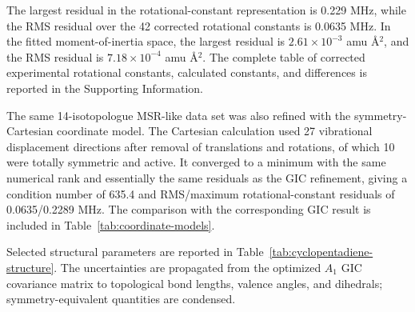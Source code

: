 \documentclass[journal=jctcce,manuscript=article,maxauthors=999]{achemso}
\begin{document}
The largest residual in the rotational-constant representation is 0.229 MHz, while the RMS residual over the 42 corrected rotational constants is 0.0635 MHz. In the fitted moment-of-inertia space, the largest residual is $2.61\times10^{-3}$ amu \AA$^2$, and the RMS residual is $7.18\times10^{-4}$ amu \AA$^2$. The complete table of corrected experimental rotational constants, calculated constants, and differences is reported in the Supporting Information.

The same 14-isotopologue MSR-like data set was also refined with the
symmetry-Cartesian coordinate model. The Cartesian calculation
used 27 vibrational displacement directions after removal of translations and
rotations, of which 10 were totally symmetric and active. It converged to a
minimum with the same numerical rank and essentially the same residuals as the
GIC refinement, giving a condition number of 635.4 and RMS/maximum
rotational-constant residuals of 0.0635/0.2289 MHz. The comparison with the
corresponding GIC result is included in Table~\ref{tab:coordinate-models}.

Selected structural parameters are reported in
Table~\ref{tab:cyclopentadiene-structure}. The uncertainties are propagated
from the optimized $A_1$ GIC covariance matrix to topological bond lengths,
valence angles, and dihedrals; symmetry-equivalent quantities are condensed.
\end{document}
